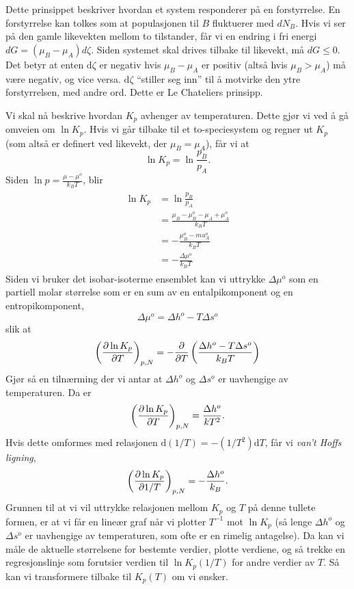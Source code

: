 Dette prinsippet beskriver hvordan et system responderer på en forstyrrelse. En forstyrrelse kan tolkes som at populasjonen til $B$ fluktuerer med $dN_B$. Hvis vi ser på den gamle likevekten mellom to tilstander, får vi en endring i fri energi $dG=(\mu_B-\mu_A)d\zeta$. Siden systemet skal drives tilbake til likevekt, må $dG\leq0$. Det betyr at enten $\text{d}\zeta$ er negativ hvis $\mu_B-\mu_A$ er positiv (altså hvis $\mu_B>\mu_A$) må være negativ, og vice versa. $\text{d}\zeta$ ``stiller seg inn'' til å motvirke den ytre forstyrrelsen, med andre ord. Dette er Le Chateliers prinsipp.

Vi skal nå beskrive hvordan $K_p$ avhenger av temperaturen. Dette gjør vi ved å gå omveien om $\ln K_p$. Hvis vi går tilbake til et to-speciesystem og regner ut $K_p$ (som altså er definert ved likevekt, der $\mu_B=\mu_A$), får vi at
\begin{equation}
	\label{vanthoff}
	\ln K_p=\ln\frac{p_B}{p_A}.
\end{equation}
Siden $\ln p = \frac{\mu-\mu^o}{k_BT}$, blir 
\begin{align}
\begin{split}
	\ln K_p&=\ln\frac{p_B}{p_A}\\
	&=\frac{\mu_B-\mu_B^o-\mu_A+\mu_A^o}{k_BT}\\
	&=-\frac{\mu_B^o-mu_A^o}{k_BT} \\
	&=-\frac{\Delta \mu^o}{k_BT}
\end{split}
\end{align}
Siden vi bruker det isobar-isoterme ensemblet kan vi uttrykke $\Delta \mu^o$ som en partiell molar størrelse som er en sum av en entalpikomponent og en entropikomponent,
\begin{equation}
	\Delta \mu^o=\Delta h^o-T\Delta s^o
\end{equation}
slik at
\begin{equation}
	\left(\frac{\partial \ln K_p}{\partial T}\right)_{p,N}=-\frac{\partial }{\partial T}\left(\frac{\Delta h^o-T\Delta s^o}{k_BT}\right)
\end{equation}
Gjør så en tilnærming der vi antar at $\Delta h^o$ og $\Delta s^o$ er uavhengige av temperaturen. Da er
\begin{equation}
	\left(\frac{\partial \ln K_p}{\partial T}\right)_{p,N}=\frac{\Delta h^o}{kT^2}.
\end{equation}
Hvis dette omformes med relasjonen $\text{d}(1/T)=-(1/T^2)\text{d}T$, får vi \emph{van't Hoffs ligning},
\begin{equation}
	\left(\frac{\partial \ln K_p}{\partial 1/T}\right)_{p,N}=-\frac{\Delta h^o}{k_B}.
\end{equation}
Grunnen til at vi vil uttrykke relasjonen mellom $K_p$ og $T$ på denne tullete formen, er at vi får en lineær graf når vi plotter $T^{-1}$ mot $\ln K_p$ (så lenge $\Delta h^o$ og $\Delta s^o$ er uavhengige av temperaturen, som ofte er en rimelig antagelse). Da kan vi måle de aktuelle størrelsene for bestemte verdier, plotte verdiene, og så trekke en regresjonslinje som forutsier verdien til $\ln K_p(1/T)$ for andre verdier av $T$. Så kan vi transformere tilbake til $K_p(T)$ om vi ønsker.

